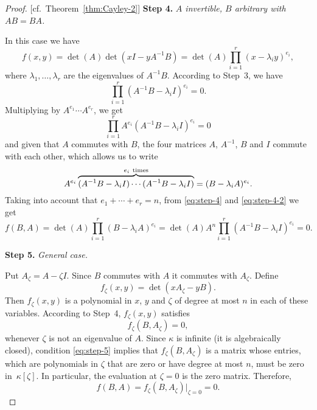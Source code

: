 \begin{proof} {[cf.~Theorem~\ref{thm:Cayley-2}]}
    \textbf{Step 4.} \textit{$A$ invertible, $B$ arbitrary with $AB=BA$.}

    In this case we have
    \begin{equation}\label{eq:step-4}
        f(x,y) = \det(A)\det(xI-yA^{-1}B)
            = \det(A)\prod_{i=1}^r(x-\lambda_i y)^{e_i},
    \end{equation}
    where $\lambda_1,\dots,\lambda_r$ are the eigenvalues of $A^{-1}B$. According to Step~3, we have
    \begin{equation}\label{eq:step-4-2}
        \prod_{i=1}^r(A^{-1}B-\lambda_iI)^{e_i}=0.
    \end{equation}
    Multiplying by $A^{e_1}\cdots A^{e_r}$, we get
    \begin{equation*}
        \prod_{i=1}^rA^{e_i}(A^{-1}B-\lambda_iI)^{e_i}=0
    \end{equation*}
    and given that $A$ commutes with $B$, the four matrices $A$, $A^{-1}$, $B$ and $I$ commute with each other, which allows us to write
    \begin{equation}\label{eq:step-4-3}
        A^{e_i}\overbrace{(A^{-1}B-\lambda_iI)
            \cdots(A^{-1}B-\lambda_iI)}^{e_i\ \rm times} = (B-\lambda_iA)^{e_i}.
    \end{equation}
    Taking into account that $e_1+\cdots+e_r=n$, from \eqref{eq:step-4} and \eqref{eq:step-4-2} we get
    $$
        f(B,A) = \det(A)\prod_{i=1}^r(B-\lambda_iA)^{e_i}
        = \det(A)A^n\prod_{i=1}^r(A^{-1}B-\lambda_iI)^{e_i}=0.
    $$

    \textbf{Step 5.} \textit{General case.}

    Put $A_\zeta=A-\zeta I$. Since $B$ commutes with $A$ it commutes with $A_\zeta$. Define
    $$
        f_\zeta(x,y) = \det(xA_\zeta-yB).
    $$
    Then $f_\zeta(x,y)$ is a polynomial in $x$, $y$ and $\zeta$ of degree at most $n$ in each of these variables. According to Step~4, $f_\zeta(x,y)$ satisfies
    \begin{equation}\label{eq:step-5}
        f_\zeta(B,A_\zeta) = 0,
    \end{equation}
    whenever $\zeta$ is not an eigenvalue of $A$. Since $\kappa$ is infinite (it is algebraically closed), condition \eqref{eq:step-5} implies that $f_\zeta(B,A_\zeta)$ is a matrix whose entries, which are polynomials in $\zeta$ that are zero or have degree at most $n$, must be zero in~$\kappa[\zeta]$. In particular, the evaluation at $\zeta=0$ is the zero matrix. Therefore,
    $$
        f(B,A) = f_\zeta(B,A_\zeta)|_{\zeta=0} = 0.
    $$
\end{proof}

